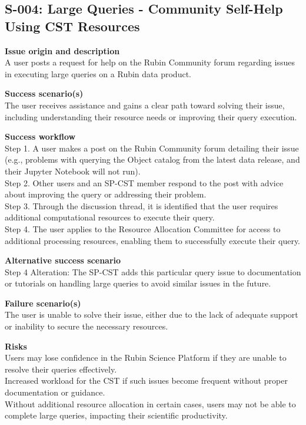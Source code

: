 \subsection{S-004: Large Queries - Community Self-Help Using CST Resources}

\textbf{Issue origin and description} \\
A user posts a request for help on the Rubin Community forum regarding issues in executing large queries on a Rubin data product.

\textbf{Success scenario(s)} \\
The user receives assistance and gains a clear path toward solving their issue, including understanding their resource needs or improving their query execution.

\textbf{Success workflow} \\
Step 1. A user makes a post on the Rubin Community forum detailing their issue (e.g., problems with querying the Object catalog from the latest data release, and their Jupyter Notebook will not run). \\
Step 2. Other users and an SP-CST member respond to the post with advice about improving the query or addressing their problem. \\
Step 3. Through the discussion thread, it is identified that the user requires additional computational resources to execute their query. \\
Step 4. The user applies to the Resource Allocation Committee for access to additional processing resources, enabling them to successfully execute their query.

\textbf{Alternative success scenario} \\
Step 4 Alteration: The SP-CST adds this particular query issue to documentation or tutorials on handling large queries to avoid similar issues in the future.

\textbf{Failure scenario(s)} \\
The user is unable to solve their issue, either due to the lack of adequate support or inability to secure the necessary resources.

\textbf{Risks} \\
Users may lose confidence in the Rubin Science Platform if they are unable to resolve their queries effectively. \\
Increased workload for the CST if such issues become frequent without proper documentation or guidance. \\
Without additional resource allocation in certain cases, users may not be able to complete large queries, impacting their scientific productivity.


